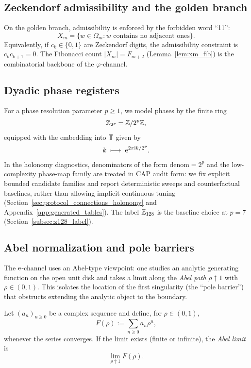 \subsection{Zeckendorf admissibility and the golden branch}

On the golden branch, admissibility is enforced by the forbidden word ``11'':
\[
X_m=\{w\in\Omega_m:\text{$w$ contains no adjacent ones}\}.
\]
Equivalently, if $c_k\in\{0,1\}$ are Zeckendorf digits, the admissibility constraint is $c_kc_{k+1}=0$.
The Fibonacci count $|X_m|=F_{m+2}$ (Lemma~\ref{lem:xm_fib}) is the combinatorial backbone of the $\varphi$-channel.

\subsection{Dyadic phase registers}

For a phase resolution parameter $p\ge 1$, we model phases by the finite ring
\[
\mathbb{Z}_{2^p}=\mathbb{Z}/2^p\mathbb{Z},
\]
equipped with the embedding into $\mathbb{T}$ given by
\[
k\;\longmapsto\;\mathrm{e}^{2\pi\mathrm{i} k/2^p}.
\]
In the holonomy diagnostics, denominators of the form $\mathrm{denom}=2^p$ and the low-complexity phase-map family are treated in CAP audit form: we fix explicit bounded candidate families and report deterministic sweeps and counterfactual baselines, rather than allowing implicit continuous tuning (Section~\ref{sec:protocol_connections_holonomy} and Appendix~\ref{app:generated_tables}).
The label $\mathbb{Z}_{128}$ is the baseline choice at $p=7$ (Section~\ref{subsec:z128_label}).

\subsection{Abel normalization and pole barriers}

The $\mathrm{e}$-channel uses an Abel-type viewpoint: one studies an analytic generating function on the open unit disk and takes a limit along the \emph{Abel path} $\rho\uparrow 1$ with $\rho\in(0,1)$.
This isolates the location of the first singularity (the ``pole barrier'') that obstructs extending the analytic object to the boundary.

\begin{definition}\label{def:abel_sum}
Let $(a_n)_{n\ge 0}$ be a complex sequence and define, for $\rho\in(0,1)$,
\[
F(\rho):=\sum_{n\ge 0} a_n \rho^n,
\]
whenever the series converges.
If the limit exists (finite or infinite), the \emph{Abel limit} is
\[
\lim_{\rho\uparrow 1} F(\rho).
\]
\end{definition}

